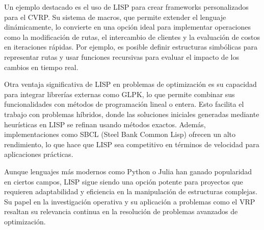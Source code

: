 \documentclass{article}
\begin{document}
Un ejemplo destacado es el uso de LISP para crear frameworks personalizados para el CVRP. Su sistema de macros, que permite extender el lenguaje dinámicamente, lo convierte en una opción ideal para implementar operaciones como la modificación de rutas, el intercambio de clientes y la evaluación de costos en iteraciones rápidas. Por ejemplo, es posible definir estructuras simbólicas para representar rutas y usar funciones recursivas para evaluar el impacto de los cambios en tiempo real.

Otra ventaja significativa de LISP en problemas de optimización es su capacidad para integrar librerías externas como GLPK, lo que permite combinar sus funcionalidades con métodos de programación lineal o entera. Esto facilita el trabajo con problemas híbridos, donde las soluciones iniciales generadas mediante heurísticas en LISP se refinan usando métodos exactos. Además, implementaciones como SBCL (Steel Bank Common Lisp) ofrecen un alto rendimiento, lo que hace que LISP sea competitivo en términos de velocidad para aplicaciones prácticas.

Aunque lenguajes más modernos como Python o Julia han ganado popularidad en ciertos campos, LISP sigue siendo una opción potente para proyectos que requieren adaptabilidad y eficiencia en la manipulación de estructuras complejas. Su papel en la investigación operativa y su aplicación a problemas como el VRP resaltan su relevancia continua en la resolución de problemas avanzados de optimización.



 
\end{document}
